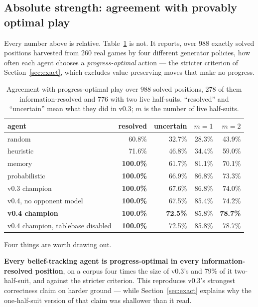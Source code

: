 \documentclass[11pt,a4paper]{article}
\begin{document}
\subsection{Absolute strength: agreement with provably optimal play}
\label{sec:res-absolute}

Every number above is relative. Table~\ref{tab:exact} is not. It reports, over
988 exactly solved positions harvested from 260 real games by four different
generator policies, how often each agent chooses a \emph{progress-optimal}
action --- the stricter criterion of Section~\ref{sec:exact}, which excludes
value-preserving moves that make no progress.

\begin{table}[t]
\centering
\small
\begin{tabular}{lrrrr}
\toprule
agent & resolved & uncertain & $m{=}1$ & $m{=}2$ \\
\midrule
random             & 60.8\% & 32.7\% & 28.3\% & 43.9\% \\
heuristic          & 71.6\% & 46.8\% & 34.4\% & 59.0\% \\
memory             & \textbf{100.0\%} & 61.7\% & 81.1\% & 70.1\% \\
probabilistic      & \textbf{100.0\%} & 66.9\% & 86.8\% & 73.3\% \\
v0.3 champion      & \textbf{100.0\%} & 67.6\% & 86.8\% & 74.0\% \\
v0.4, no opponent model & \textbf{100.0\%} & 67.5\% & 85.4\% & 74.2\% \\
\textbf{v0.4 champion}  & \textbf{100.0\%} & \textbf{72.5\%} & 85.8\% & \textbf{78.7\%} \\
v0.4 champion, tablebase disabled & \textbf{100.0\%} & 72.5\% & 85.8\% & 78.7\% \\
\bottomrule
\end{tabular}
\caption{Agreement with progress-optimal play over 988 solved positions, 278 of
them information-resolved and 776 with two live half-suits. ``resolved'' and
``uncertain'' mean what they did in v0.3; $m$ is the number of live half-suits.}
\label{tab:exact}
\end{table}

Four things are worth drawing out.

\textbf{Every belief-tracking agent is progress-optimal in every
information-resolved position}, on a corpus four times the size of v0.3's and
79\% of it two-half-suit, and against the stricter criterion. This reproduces
v0.3's strongest correctness claim on harder ground --- while
Section~\ref{sec:exact} explains why the one-half-suit version of that claim was
shallower than it read.
\end{document}
